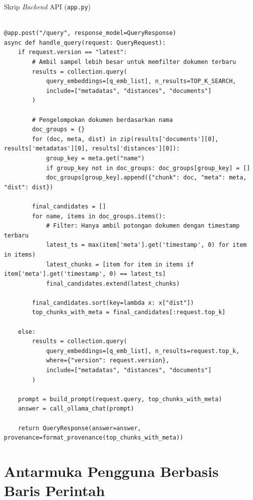 \begin{myblock}{Skrip \textit{Backend} API (\texttt{app.py})}\label{kode:app}
\begin{verbatim}

@app.post("/query", response_model=QueryResponse)
async def handle_query(request: QueryRequest):
    if request.version == "latest":
        # Ambil sampel lebih besar untuk memfilter dokumen terbaru
        results = collection.query(
            query_embeddings=[q_emb_list], n_results=TOP_K_SEARCH,
            include=["metadatas", "distances", "documents"]
        )
        
        # Pengelompokan dokumen berdasarkan nama
        doc_groups = {}
        for (doc, meta, dist) in zip(results['documents'][0], results['metadatas'][0], results['distances'][0]):
            group_key = meta.get("name")
            if group_key not in doc_groups: doc_groups[group_key] = []
            doc_groups[group_key].append({"chunk": doc, "meta": meta, "dist": dist})

        final_candidates = []
        for name, items in doc_groups.items():
            # Filter: Hanya ambil potongan dokumen dengan timestamp terbaru
            latest_ts = max(item['meta'].get('timestamp', 0) for item in items)
            latest_chunks = [item for item in items if item['meta'].get('timestamp', 0) == latest_ts]
            final_candidates.extend(latest_chunks)
            
        final_candidates.sort(key=lambda x: x["dist"]) 
        top_chunks_with_meta = final_candidates[:request.top_k]

    else:
        results = collection.query(
            query_embeddings=[q_emb_list], n_results=request.top_k,
            where={"version": request.version},
            include=["metadatas", "distances", "documents"]
        )

    prompt = build_prompt(request.query, top_chunks_with_meta)
    answer = call_ollama_chat(prompt)
    
    return QueryResponse(answer=answer, provenance=format_provenance(top_chunks_with_meta))
\end{verbatim}
\end{myblock}

\section{Antarmuka Pengguna Berbasis Baris Perintah}

